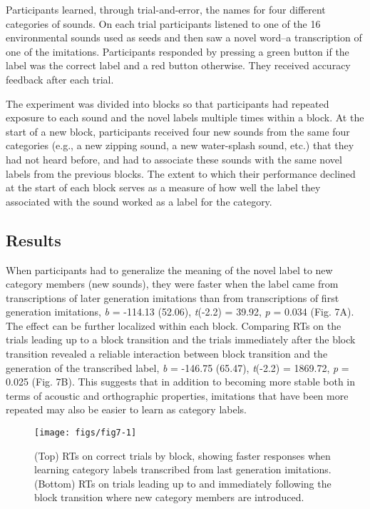 \documentclass[10pt,letterpaper]{article}
\begin{document}
Participants learned, through trial-and-error, the names for four
different categories of sounds. On each trial participants listened to
one of the 16 environmental sounds used as seeds and then saw a novel
word--a transcription of one of the imitations. Participants responded
by pressing a green button if the label was the correct label and a red
button otherwise. They received accuracy feedback after each trial.

The experiment was divided into blocks so that participants had repeated
exposure to each sound and the novel labels multiple times within a
block. At the start of a new block, participants received four new
sounds from the same four categories (e.g., a new zipping sound, a new
water-splash sound, etc.) that they had not heard before, and had to
associate these sounds with the same novel labels from the previous
blocks. The extent to which their performance declined at the start of
each block serves as a measure of how well the label they associated
with the sound worked as a label for the category.

\subsection{Results}\label{results-4}

When participants had to generalize the meaning of the novel label to
new category members (new sounds), they were faster when the label came
from transcriptions of later generation imitations than from
transcriptions of first generation imitations, \emph{b} = -114.13
(52.06), \emph{t}(-2.2) = 39.92, \emph{p} = 0.034 (Fig. 7A). The effect
can be further localized within each block. Comparing RTs on the trials
leading up to a block transition and the trials immediately after the
block transition revealed a reliable interaction between block
transition and the generation of the transcribed label, \emph{b} =
-146.75 (65.47), \emph{t}(-2.2) = 1869.72, \emph{p} = 0.025 (Fig. 7B).
This suggests that in addition to becoming more stable both in terms of
acoustic and orthographic properties, imitations that have been more
repeated may also be easier to learn as category labels.

\begin{figure}
\texttt{[image: figs/fig7-1]} \caption{(Top) RTs on correct trials by block, showing faster responses when learning category labels transcribed from last generation imitations. (Bottom) RTs on trials leading up to and immediately following the block transition where new category members are introduced.}\label{fig:fig7}
\end{figure}
\end{document}
